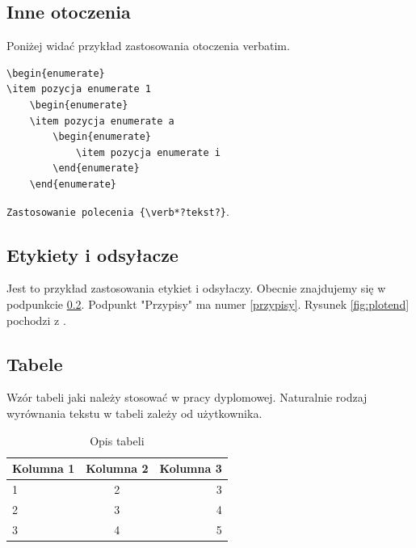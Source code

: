 \subsection{Inne otoczenia}
Poniżej widać przykład zastosowania otoczenia verbatim.
\begin{verbatim}
\begin{enumerate}
\item pozycja enumerate 1
	\begin{enumerate}
	\item pozycja enumerate a
		\begin{enumerate}
			\item pozycja enumerate i
		\end{enumerate}
	\end{enumerate}
\end{verbatim}

{\verb*#Zastosowanie polecenia {\verb*?tekst?}#}. 

\subsection{Etykiety i odsyłacze}\label{etykiety}
Jest to przykład zastosowania etykiet i odsyłaczy. Obecnie znajdujemy się w podpunkcie \ref{etykiety}. Podpunkt "Przypisy" ma numer \ref{przypisy}. Rysunek \ref{fig:plotend} pochodzi z \cite{www-1}.


\subsection{Tabele}
Wzór tabeli jaki należy stosować w pracy dyplomowej. Naturalnie rodzaj wyrównania tekstu w tabeli zależy od użytkownika.
\begin{table}[!ht]
	\begin{center}
	\caption{{\footnotesize Opis tabeli}}
	\begin{small}
	\begin{tabular}{|l|c|r|} \hline
	Kolumna 1 & Kolumna 2 & Kolumna 3 \\ \hline
	1 & 2 & 3 \\ \hline
	2 & 3 & 4 \\ \hline
	3 & 4 & 5 \\ \hline
	\end{tabular}
	\end{small}
	\end{center}
\end{table}

